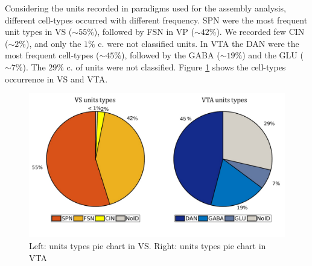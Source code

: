 Considering the units recorded in paradigms used for the assembly analysis, different cell-types occurred with different frequency. SPN were the most frequent unit types in VS ($\sim55\%$), followed by FSN in VP ($\sim42\%$). We recorded few CIN ($\sim2\%$), and only the $1\%$ c. were not classified units. In VTA the DAN were the most frequent cell-types ($\sim45\%$), followed by the GABA ($\sim19\%$) and the GLU ($\sim7\%$). The $29\%$ c. of units were not classified. Figure \ref{fig:PieRegions} shows the cell-types occurrence in VS and VTA.
\begin{figure}[H]
  \centering
    \includegraphics[scale=0.5]{figures/PieRegions1.pdf}
   \caption{Left: units types pie chart in VS. Right: units types pie chart in VTA}
    \label{fig:PieRegions}
\end{figure}

